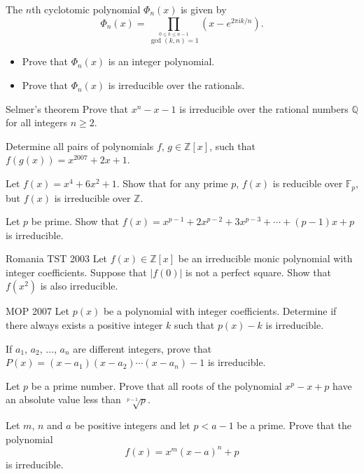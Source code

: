 \documentclass[11pt]{scrartcl}
\begin{document}
\begin{problem}[1]{}
The $n$th cyclotomic polynomial $\Phi_n(x)$ is given by \[\Phi_n(x) = \prod_{\stackrel{0\le k\le n-1}{\gcd(k, n) = 1}}(x-e^{2\pi i k/n}).\]
\begin{itemize}
\item[(a)] Prove that $\Phi_n(x)$ is an integer polynomial.
\item[(b)] Prove that $\Phi_n(x)$ is irreducible over the rationals.
\end{itemize}
\end{problem}
\begin{problem}[2]{Selmer's theorem}
Prove that $x^n - x - 1$ is irreducible over the rational numbers $\mathbb{Q}$ for all integers $n \ge 2$.
\end{problem}
\begin{problem}[3]{}
Determine all pairs of polynomials $f$, $g \in \mathbb{Z}[x]$, such that $f(g(x)) = x^{2007}+2x+1$.
\end{problem}
\begin{problem}[4]{}
Let $f(x) = x^4 + 6x^2 + 1$. Show that for any prime $p$, $f(x)$ is reducible over $\mathbb{F}_p$, but $f(x)$ is irreducible over $\mathbb{Z}$.
\end{problem}
\begin{problem}[5]{}
Let $p$ be prime. Show that $f(x) = x^{p-1} + 2x^{p-2}+ 3x^{p-3}+ \cdots + (p - 1)x + p$ is irreducible.
\end{problem}
\begin{problem}[6]{Romania TST 2003}
Let $f(x) \in \mathbb{Z}[x]$ be an irreducible monic polynomial with integer coefficients. Suppose that $|f(0)|$ is not a perfect square. Show that $f(x^2)$ is also irreducible.
\end{problem}
\begin{problem}[7]{MOP 2007}
Let $p(x)$ be a polynomial with integer coefficients. Determine if there always exists a positive integer $k$ such that $p(x) - k$ is irreducible.
\end{problem}
\begin{problem}[8]{}
If $a_1$, $a_2$, $\dots$, $a_n$ are different integers, prove that $P(x) = (x - a_1)(x - a_2)\cdots(x - a_n) - 1$ is irreducible.
\end{problem}
\begin{problem}[9]{}
Let $p$ be a prime number. Prove that all roots of the polynomial $x^p - x + p$ have an absolute value less than $\sqrt[p-1]{p}$.
\end{problem}
\begin{problem}[10]{}
Let $m$, $n$ and $a$ be positive integers and let $p < a - 1$ be a prime. Prove that the polynomial \[f(x) = x^m(x - a)^n + p\] is irreducible.
\end{problem}
\end{document}
